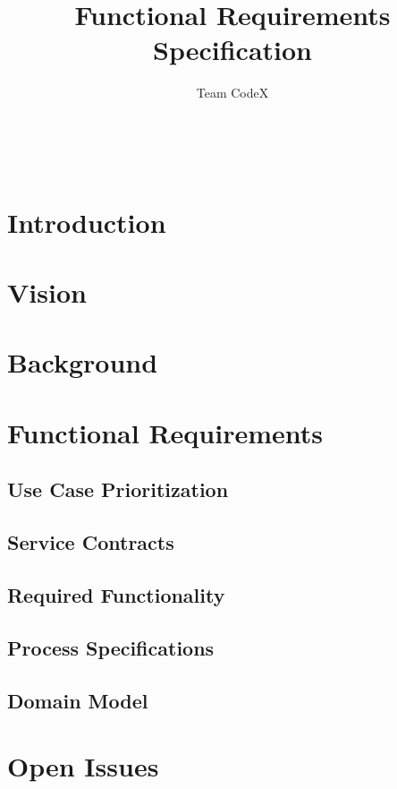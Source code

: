 \documentclass[11pt]{article}
\author{Team CodeX}
\title{Functional Requirements Specification}
\begin{document}
	\setlength{\parskip}{6pt}
	
	
	
	\renewcommand{\thesection}{\arabic{section}}
	\newpage
	
	\tableofcontents
	
	\textsc{}\\[1cm]
	
	\newpage
	
	\section{Introduction}
		
	
	\section{Vision}
		
	
	\section{Background}
		
		
	\section{Functional Requirements}
	
	\subsection{Use Case Prioritization}
		
	
	\subsection{Service Contracts}
	
	
	\subsection{Required Functionality}
	
	
	\subsection{Process Specifications}
	
	
	\subsection{Domain Model}
	
	
	\section{Open Issues}
		
	
\end{document}
